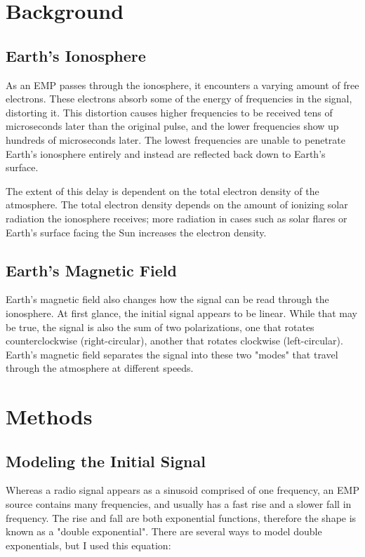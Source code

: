 \documentclass[12pt, reqno]{amsart}
\begin{document}
\section{Background}
\subsection{Earth's Ionosphere}
 \noindent As an EMP passes through the ionosphere, it encounters a varying amount of free electrons. These electrons absorb some of the energy of frequencies in the signal, distorting it. This distortion causes higher frequencies to be received tens of microseconds later than the original pulse, and the lower frequencies show up hundreds of microseconds later. The lowest frequencies are unable to penetrate Earth's ionosphere entirely and instead are reflected back down to Earth's surface.

\noindent The extent of this delay is dependent on the total electron density of the atmosphere. The total electron density depends on the amount of ionizing solar radiation the ionosphere receives; more radiation in cases such as solar flares or Earth's surface facing the Sun increases the electron density.

\subsection{Earth's Magnetic Field}

\noindent Earth's magnetic field also changes how the signal can be read through the ionosphere. At first glance, the initial signal appears to be linear. While that may be true, the signal is also the sum of two polarizations, one that rotates counterclockwise (right-circular), another that rotates clockwise (left-circular). Earth's magnetic field separates the signal into these two "modes" that travel through the atmosphere at different speeds.


\section{Methods}
\subsection{Modeling the Initial Signal}
\noindent Whereas a radio signal appears as a sinusoid comprised of one frequency,
an EMP source contains many frequencies,  and usually has a fast rise and a slower fall in frequency. The rise and fall are both exponential functions, therefore the shape is known as a "double exponential". There are several ways to model double exponentials, but I used this equation:
\end{document}

